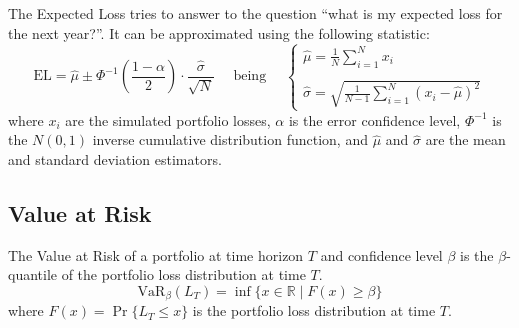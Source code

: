\documentclass[11pt,fleqn]{book} %
\begin{document}
The Expected Loss tries to answer to the question \enquote{what is my expected 
loss for the next year?}. It can be approximated using the following 
statistic:
\begin{displaymath}
	\text{EL} = \widehat{\mu} \pm \Phi^{-1}\left(\frac{1-\alpha}{2}\right) \cdot \frac{\widehat{\sigma}}{\sqrt{N}}
	\quad \text{ being } \quad
	\left\{
	\begin{array}{l}
		\displaystyle
		\widehat{\mu} = \frac{1}{N} \sum_{i=1}^{N} x_i \\
		\\
		\displaystyle
		\widehat{\sigma} =
		\sqrt{\frac{1}{N-1} \sum_{i=1}^{N} \left( x_i - \widehat{\mu} \right)^2}
	\end{array}
	\right.
\end{displaymath}
where $x_i$ are the simulated portfolio losses, $\alpha$ is the error 
confidence level, $\Phi^{-1}$ is the $N(0,1)$ inverse cumulative distribution 
function, and $\widehat{\mu}$ and $\widehat{\sigma}$ are the mean and standard 
deviation estimators.

\subsection{Value at Risk}

\begin{definition}
	The Value at Risk of a portfolio at time horizon $T$ and 
	confidence level $\beta$ is the $\beta$-quantile of the portfolio loss 
	distribution at time $T$.
	\begin{displaymath}
		\text{VaR}_\beta(L_T) = \inf\{x \in \mathbb{R} \mid F(x) \ge \beta \}
	\end{displaymath}
	where $F(x)=\Pr\{L_T \le x\}$ is the portfolio loss distribution at time $T$.
\end{definition}
\end{document}
